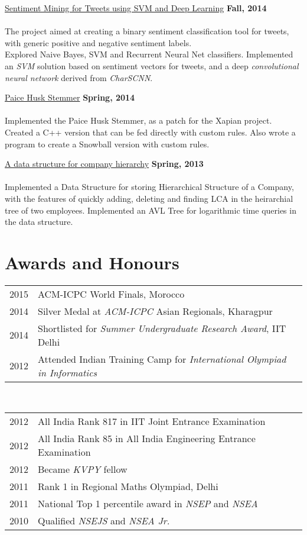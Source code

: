 \documentclass[margin,line]{res}
\begin{document}
\begin{resume}
\underline{\sc Sentiment Mining for Tweets using SVM and Deep Learning} \hfill {\bf Fall, 2014}\\\\
The project aimed at creating a binary sentiment classification tool for tweets, with generic positive and negative sentiment labels. \\Explored Naive Bayes, SVM and Recurrent Neural Net classifiers. Implemented an \emph{SVM} solution based on sentiment vectors for tweets, and a deep \emph{convolutional neural network} derived from \emph{CharSCNN}.

\underline{\sc Paice Husk Stemmer} \hfill {\bf Spring, 2014}\\\\
Implemented the Paice Husk Stemmer, as a patch for the Xapian project. Created a C++ version that can be fed directly with custom rules. Also wrote a program to create a Snowball version with custom rules.

\underline{\sc A data structure for company hierarchy} \hfill {\bf Spring, 2013}\\\\
Implemented a Data Structure for storing Hierarchical Structure of a Company, with the features of quickly adding, deleting and finding LCA in the heirarchial tree of two employees. Implemented an AVL Tree for logarithmic time queries in the data structure.

\section{\sc Awards and Honours}

\begin{tabular}{rl}
2015 & ACM-ICPC World Finals, Morocco\\
2014 & Silver Medal at {\em ACM-ICPC} Asian Regionals, Kharagpur\\
2014 & Shortlisted for {\em Summer Undergraduate Research Award}, IIT Delhi\\
2012 & Attended Indian Training Camp for {\em International Olympiad in Informatics}\\
\end{tabular}\\
\begin{tabular}{rl}
2012 & All India Rank 817 in IIT Joint Entrance Examination\\
2012 & All India Rank 85 in All India Engineering Entrance Examination\\
2012 & Became {\em KVPY} fellow\\
2011 & Rank 1 in Regional Maths Olympiad, Delhi\\
2011 & National Top 1 percentile award in {\em NSEP} and {\em NSEA}\\
2010 & Qualified {\em NSEJS} and {\em NSEA Jr.}\\
\end{tabular}


\end{resume}
\end{document}
